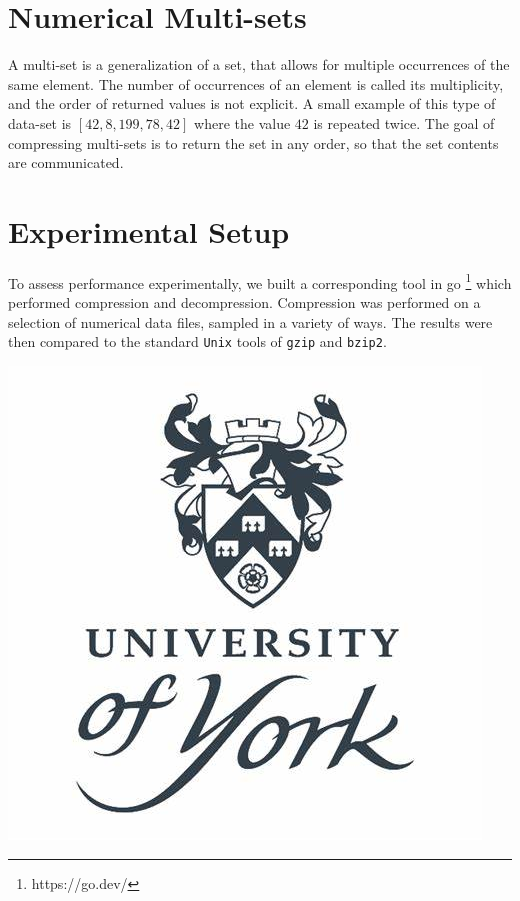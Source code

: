 \documentclass[a0paper,fleqn]{betterposter}
\begin{document}
{\section{Numerical Multi-sets}
A multi-set is a generalization of a set, that allows for multiple occurrences of the same element. The number of occurrences of an element is called its multiplicity, and the order of returned values is not explicit. A small example of this type of data-set is  $[42, 8, 199, 78, 42]$ where the value $42$ is repeated twice. The goal of compressing multi-sets is to return the set in any order, so that the set contents are communicated.

\section{Experimental Setup}
To assess performance experimentally, we built a corresponding  tool in go \footnote{\huge https://go.dev/} which performed compression and decompression. Compression was performed on a selection of numerical data files, sampled in a variety of ways. The results were then compared to the standard \texttt{Unix} tools of  \texttt{gzip} and \texttt{bzip2}. 

\vfill

\begin{center}
    \includegraphics[scale=0.6]{img/ylogo.jpg}\\
\end{center}
}
\end{document}
